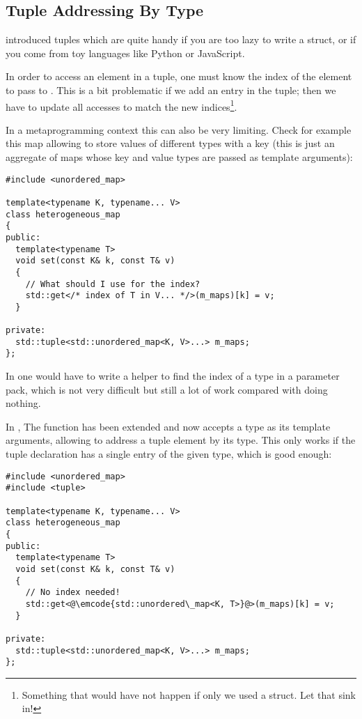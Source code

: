 \subsection{Tuple Addressing By Type}

 introduced tuples  which are quite handy if
you are too lazy to write a struct, or if you come from toy languages
like Python or JavaScript.

In order to access an element in a tuple, one must know the index of
the element to pass to . This is a bit problematic if
we add an entry in the tuple; then we have to update all
accesses to match the new indices\footnote{Something that would have
not happen if only we used a struct. Let that sink in!}.

In a metaprogramming context this can also be very limiting. Check for
example this map allowing to store values of different types with a
key (this is just an aggregate of maps whose key and value types are
passed as template arguments):

\begin{lstlisting}
#include <unordered_map>

template<typename K, typename... V>
class heterogeneous_map
{
public:
  template<typename T>
  void set(const K& k, const T& v)
  {
    // What should I use for the index?
    std::get</* index of T in V... */>(m_maps)[k] = v;
  }

private:
  std::tuple<std::unordered_map<K, V>...> m_maps;
};
\end{lstlisting}

In  one would have to write a helper to find the index of a type
in a parameter pack, which is not very difficult but still a lot of
work compared with doing nothing.

\bigskip

In , The  function has been extended and now
accepts a type as its template arguments, allowing to address a tuple
element by its type. This only works if the tuple declaration has a
single entry of the given type, which is good enough:

\begin{lstlisting}
#include <unordered_map>
#include <tuple>

template<typename K, typename... V>
class heterogeneous_map
{
public:
  template<typename T>
  void set(const K& k, const T& v)
  {
    // No index needed!
    std::get<@\emcode{std::unordered\_map<K, T>}@>(m_maps)[k] = v;
  }

private:
  std::tuple<std::unordered_map<K, V>...> m_maps;
};
\end{lstlisting}
